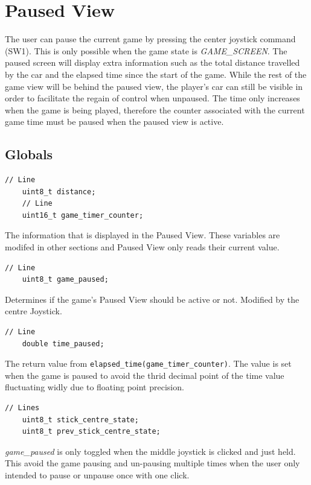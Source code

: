 \documentclass{article}
\begin{document}
\clearpage

\section{Paused View}
The user can pause the current game by pressing the center joystick command (SW1). This is only possible when the game state is \emph{GAME\_SCREEN}. The paused screen will display extra information such as the total distance travelled by the car and the elapsed time since the start of the game. While the rest of the game view will be behind the paused view, the player's car can still be visible in order to facilitate the regain of control when unpaused. The time only increases when the game is being played, therefore the counter associated with the current game time must be paused when the paused view is active.

\subsection*{Globals}
\begin{lstlisting}[style=CStyle]
	// Line
	uint8_t distance;
	// Line
	uint16_t game_timer_counter;
\end{lstlisting}
The information that is displayed in the Paused View. These variables are modifed in other sections and Paused View only reads their current value.
\begin{lstlisting}[style=CStyle]
	// Line
	uint8_t game_paused;
\end{lstlisting}
Determines if the game's Paused View should be active or not. Modified by the centre Joystick.
\begin{lstlisting}[style=CStyle]
	// Line
	double time_paused;
\end{lstlisting}
The return value from \lstinline{elapsed_time(game_timer_counter)}. The value is set when the game is paused to avoid the thrid decimal point of the time value fluctuating widly due to floating point precision.
\begin{lstlisting}[style=CStyle]
	// Lines
	uint8_t stick_centre_state;
	uint8_t prev_stick_centre_state;
\end{lstlisting}
\emph{game\_paused} is only toggled when the middle joystick is clicked and just held. This avoid the game pausing and un-pausing multiple times when the user only intended to pause or unpause once with one click. 
\newline
\end{document}
